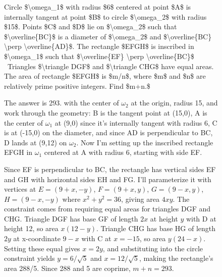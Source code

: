 \begin{figure}[H]
\centering
\setlength{\columnsep}{12pt}
\setlength{\colw}{\dimexpr(\linewidth-\columnsep)/2\relax}
\begin{promptrow}
\caret{}\par\vspace{4pt}
Circle \$\textbackslash{}omega\_1\$ with radius \$6\$ centered at point \$A\$ is internally tangent at point \$B\$ to circle \$\textbackslash{}omega\_2\$ with radius \$15\$. Points \$C\$ and \$D\$ lie on \$\textbackslash{}omega\_2\$ such that \$\textbackslash{}overline\{BC\}\$ is a diameter of \$\textbackslash{}omega\_2\$ and \$\textbackslash{}overline\{BC\} \textbackslash{}perp \textbackslash{}overline\{AD\}\$. The rectangle \$EFGH\$ is inscribed in \$\textbackslash{}omega\_1\$ such that \$\textbackslash{}overline\{EF\} \textbackslash{}perp \textbackslash{}overline\{BC\}\$ \elide\ Triangles \$\textbackslash{}triangle DGF\$ and \$\textbackslash{}triangle CHG\$ have equal areas. The area of rectangle \$EFGH\$ is \$m/n\$, where \$m\$ and \$n\$ are relatively prime positive integers. Find \$m+n.\$
\end{promptrow}
\vspace{12pt}
\noindent
\begin{reasoncol}[equal height group=sfC]
  \caret{}\par\vspace{4pt}
  \raggedright
  The answer is 293.  with the center of \(\omega_2\) at the origin, radius 15, and work through the geometry: B is the tangent point at (15,0), A is the center of \(\omega_1\) at (9,0) since it's internally tangent with radius 6, C is at (-15,0) on the diameter, and since AD is perpendicular to BC, D lands at (9,12) on \(\omega_2\). Now I'm setting up the inscribed rectangle EFGH in \(\omega_1\) centered at A with radius 6, starting with side EF.\par\vspace{3pt}
  Since EF is perpendicular to BC, the rectangle has vertical sides EF and GH with horizontal sides EH and FG. I'll parameterize it with vertices at \(E=(9+x,-y)\), \(F=(9+x,y)\), \(G=(9-x,y)\), \(H=(9-x,-y)\) where \(x^2+y^2=36\), giving area \(4xy\). The constraint comes from requiring equal areas for triangles DGF and CHG. Triangle DGF has base GF of length \(2x\) at height \(y\) with D at height 12, so area \(x(12-y)\). Triangle CHG has base HG of length \(2y\) at x-coordinate \(9-x\) with C at \(x=-15\), so area \(y(24-x)\). Setting these equal gives \(x=2y\), and substituting into the circle constraint yields \(y=6/\sqrt5\) and \(x=12/\sqrt5\), making the rectangle's area 288/5. Since 288 and 5 are coprime, \(m+n=293\).

\end{reasoncol}
\end{figure}
